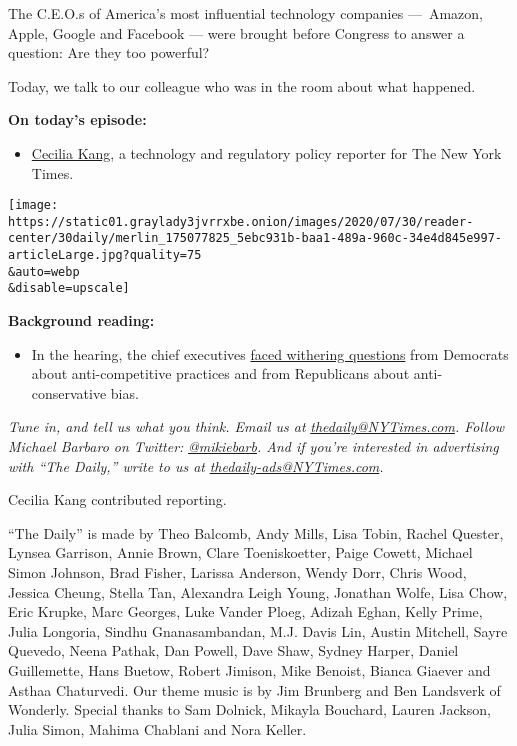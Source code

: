 The C.E.O.s of America's most influential technology companies
---~Amazon, Apple, Google and Facebook --- were brought before Congress
to answer a question: Are they too powerful?

Today, we talk to our colleague who was in the room about what happened.

\textbf{On today's episode:}

\begin{itemize}
\tightlist
\item
  \href{https://www.nytimes3xbfgragh.onion/by/cecilia-kang}{Cecilia
  Kang}, a technology and regulatory policy reporter for The New York
  Times.
\end{itemize}

\texttt{[image: https://static01.graylady3jvrrxbe.onion/images/2020/07/30/reader-center/30daily/merlin\_175077825\_5ebc931b-baa1-489a-960c-34e4d845e997-articleLarge.jpg?quality=75\\\&auto=webp\\\&disable=upscale]}

\textbf{Background reading:}

\begin{itemize}
\tightlist
\item
  In the hearing, the chief executives
  \href{https://www.nytimes3xbfgragh.onion/2020/07/29/technology/big-tech-hearing-apple-amazon-facebook-google.html}{faced
  withering questions} from Democrats about anti-competitive practices
  and from Republicans about anti-conservative bias.
\end{itemize}

\emph{Tune in, and tell us what you think. Email us at}
\href{mailto:thedaily@NYTimes.com}{\emph{thedaily@NYTimes.com}}\emph{.
Follow Michael Barbaro on Twitter:}
\href{https://twitter.com/mikiebarb}{\emph{@mikiebarb}}\emph{. And if
you're interested in advertising with ``The Daily,'' write to us at}
\href{mailto:thedaily-ads@NYTimes.com}{\emph{thedaily-ads@NYTimes.com}}\emph{.}

Cecilia Kang contributed reporting.

``The Daily'' is made by Theo Balcomb, Andy Mills, Lisa Tobin, Rachel
Quester, Lynsea Garrison, Annie Brown, Clare Toeniskoetter, Paige
Cowett, Michael Simon Johnson, Brad Fisher, Larissa Anderson, Wendy
Dorr, Chris Wood, Jessica Cheung, Stella Tan, Alexandra Leigh Young,
Jonathan Wolfe, Lisa Chow, Eric Krupke, Marc Georges, Luke Vander Ploeg,
Adizah Eghan, Kelly Prime, Julia Longoria, Sindhu Gnanasambandan, M.J.
Davis Lin, Austin Mitchell, Sayre Quevedo, Neena Pathak, Dan Powell,
Dave Shaw, Sydney Harper, Daniel Guillemette, Hans Buetow, Robert
Jimison, Mike Benoist, Bianca Giaever and Asthaa Chaturvedi. Our theme
music is by Jim Brunberg and Ben Landsverk of Wonderly. Special thanks
to Sam Dolnick, Mikayla Bouchard, Lauren Jackson, Julia Simon, Mahima
Chablani and Nora Keller.

